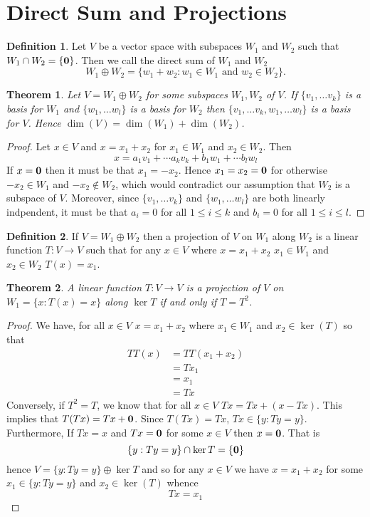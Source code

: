 \documentclass[oneside, 12pt]{book}
\newtheorem{thm}{Theorem}[section]
\theoremstyle{definition}
\newtheorem{defn}{Definition}[section]
\begin{document}
\section{Direct Sum and Projections}
\begin{defn}
  \label{defn_dirsum}
Let $V$ be a vector space with subspaces $W_{1}$ and $W_{2}$ such that $W_{1}\cap W_{2}=\{\bold{0}\}$. Then we call the direct sum of $W_{1}$ and $W_{2}$ \[W_{1}\oplus W_{2}= \{w_{1}+w_{2}: w_{1} \in W_{1} \text{ and } w_{2} \in W_{2}\}.\]
\end{defn}
\begin{thm}
  \label{thm_dirsum}
  Let $V=W_{1} \oplus W_{2}$ for some subspaces $W_{1}, W_{2}$ of $V$. If $\{v_{1}, \dots v_{k}\}$ is a basis for $W_{1}$ and $\{w_{1}, \dots w_{l}\}$ is  a basis for $W_{2}$ then $\{v_{1}, \dots v_{k}, w_{1}, \dots w_{l}\}$ is a basis for $V$. Hence $\dim(V)=\dim(W_{1})+\dim(W_{2})$.
\end{thm}
\begin{proof}
  Let $x \in V$ and $x=x_{1}+x_{2}$ for $x_{1} \in W_{1}$ and $x_{2} \in W_{2}$. Then \[x=a_{1}v_{1}+ \cdots a_{k}v_{k}+b_{1}w_{1}+ \cdots b_{l}w_{l}\]
  If $x=\bold{0}$ then it must be that $x_{1}=-x_{2}$. Hence $x_{1}=x_{2}=\bold{0}$ for otherwise $-x_{2} \in W_{1}$ and $-x_{2}\notin W_{2}$, which would contradict our assumption that $W_{2}$ is a subspace of $V$. Moreover, since $\{v_{1}, \dots v_{k}\}$ and $\{w_{1}, \dots w_{l}\}$ are both linearly indpendent, it must be that $a_{i}=0$ for all $1\le i \leq k$ and $b_{i}=0$ for all $1 \leq i \leq l $.
\end{proof}
\begin{defn}
\label{defn_prj}
 If $V=W_{1}\oplus W_{2}$ then a projection of $V$ on $W_{1}$ along $W_{2}$ is a linear function $T:V \to V$ such that for any $x \in V$ where $x=x_{1}+x_{2}$ $x_{1} \in W_{1}$ and $x_{2} \in W_{2}$ $T(x)=x_{1}$.
\end{defn}
\begin{thm}
\label{thm_projiff}
A linear function $T:V \to V$ is a projection of $V$ on $W_{1}=\{x : T(x)=x \}$ along $\ker{T}$ if and only if $T=T^{2}$.
\end{thm}
\begin{proof}
  We have, for all $x \in V$ $x=x_{1}+x_{2}$ where $x_{1} \in W_{1}$ and $x_{2} \in \ker(T)$ so that
  \begin{align}
    TT(x)&=TT(x_{1}+x_{2}) \\
         &=Tx_{1} \\
         &= x_{1} \\
    &= Tx
  \end{align}
  Conversely, if $T^{2}=T$, we know that for all $x \in V$ $Tx=Tx+(x-Tx)$. This implies that $T(Tx)=Tx+\bold{0}$. Since $T(Tx)=Tx$, $Tx \in \{y: Ty=y\}$. Furthermore, If $Tx=x$ and $Tx=\bold{0}$ for some $x \in V$ then $x= \bold{0}$. That is \[\{y:Ty=y\}\cap \ker T=\{\bold{0}\}\] hence
  $V= \{y: Ty=y\} \oplus \ker T$ and so for any $x \in V$ we have $x=x_{1}+x_{2}$ for some $x_{1}\in \{y:Ty=y\}$ and $x_{2} \in \ker(T)$
  whence
  \[Tx=x_{1}\]
\end{proof}
\end{document}
